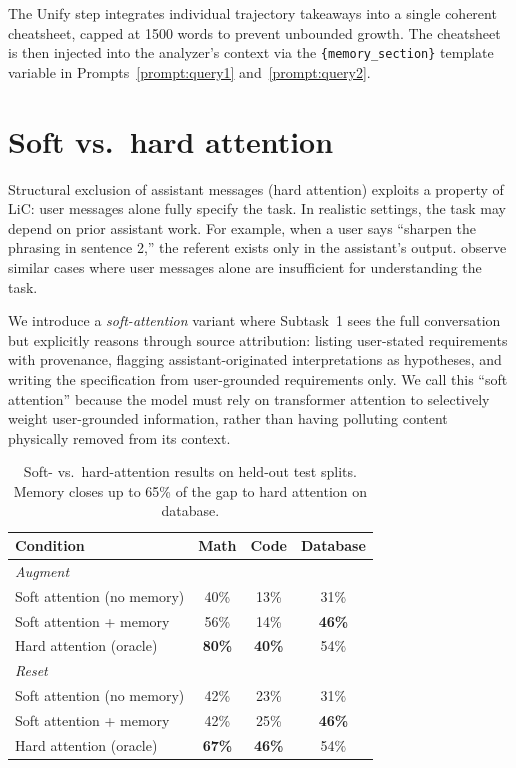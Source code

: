 \documentclass{article} %
\begin{document}
The Unify step integrates individual trajectory takeaways into a single coherent cheatsheet, capped at 1500 words to prevent unbounded growth. The cheatsheet is then injected into the analyzer's context via the \texttt{\{memory\_section\}} template variable in Prompts~\ref{prompt:query1} and~\ref{prompt:query2}.


\section{Soft vs.\ hard attention}
\label{app:soft-attention}

Structural exclusion of assistant messages (hard attention) exploits a property of LiC: user messages alone fully specify the task. In realistic settings, the task may depend on prior assistant work. For example, when a user says ``sharpen the phrasing in sentence 2,'' the referent exists only in the assistant's output. \citet{huang2026context} observe similar cases where user messages alone are insufficient for understanding the task.

We introduce a \emph{soft-attention} variant where Subtask~1 sees the full conversation but explicitly reasons through source attribution: listing user-stated requirements with provenance, flagging assistant-originated interpretations as hypotheses, and writing the specification from user-grounded requirements only. We call this ``soft attention'' because the model must rely on transformer attention to selectively weight user-grounded information, rather than having polluting content physically removed from its context.

\begin{table}[h]
\centering
\begin{tabular}{lccc}
\toprule
\textbf{Condition} & \textbf{Math} & \textbf{Code} & \textbf{Database} \\
\midrule
\multicolumn{4}{l}{\emph{Augment}} \\
\quad Soft attention (no memory) & 40\% & 13\% & 31\% \\
\quad Soft attention + memory & 56\% & 14\% & \textbf{46\%} \\
\quad Hard attention (oracle) & \textbf{80\%} & \textbf{40\%} & 54\% \\
\midrule
\multicolumn{4}{l}{\emph{Reset}} \\
\quad Soft attention (no memory) & 42\% & 23\% & 31\% \\
\quad Soft attention + memory & 42\% & 25\% & \textbf{46\%} \\
\quad Hard attention (oracle) & \textbf{67\%} & \textbf{46\%} & 54\% \\
\bottomrule
\end{tabular}
\caption{Soft- vs.\ hard-attention results on held-out test splits. Memory closes up to 65\% of the gap to hard attention on database.}
\label{tab:soft-attention}
\end{table}
\end{document}
